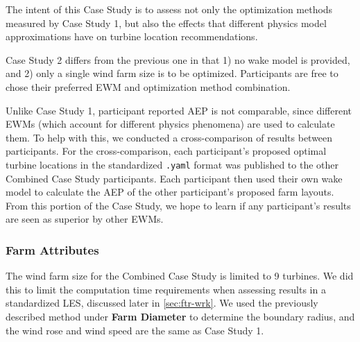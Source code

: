 The intent of this Case Study is to assess not only the optimization methods measured by Case Study 1, but also the effects that different physics model approximations have on turbine location recommendations.

Case Study 2 differs from the previous one in that 1) no wake model is provided, and 2) only a single wind farm size is to be optimized.
Participants are free to chose their preferred EWM and optimization method combination.

Unlike Case Study 1, participant reported AEP is not comparable, since different EWMs (which account for different physics phenomena) are used to calculate them.
To help with this, we conducted a cross-comparison of results between participants.
For the cross-comparison, each participant's proposed optimal turbine locations in the standardized \texttt{.yaml} format was published to the other Combined Case Study participants.
Each participant then used their own wake model to calculate the AEP of the other participant's proposed farm layouts.
From this portion of the Case Study, we hope to learn if any participant's results are seen as superior by other EWMs.

\subsubsection{Farm Attributes}
The wind farm size for the Combined Case Study is limited to 9 turbines.
We did this to limit the computation time requirements when assessing results in a standardized LES, discussed later in \cref{sec:ftr-wrk}.
We used the previously described method under \textbf{Farm Diameter} to determine the boundary radius, and the wind rose and wind speed are the same as Case Study 1.